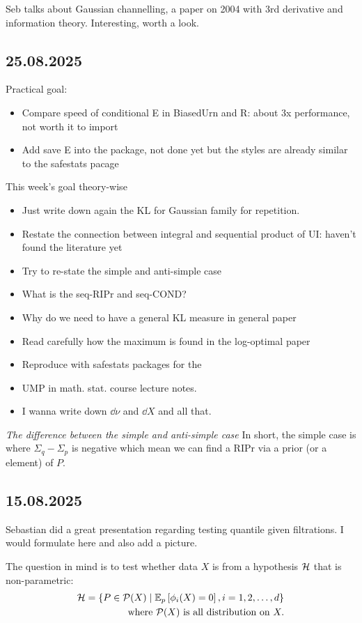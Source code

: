 Seb talks about Gaussian channelling, a paper on 2004 with 3rd derivative
and information theory. Interesting, worth a look.

\subsection*{25.08.2025}
Practical goal:
\begin{itemize}
	\item Compare speed of conditional E in BiasedUrn and R: about 3x performance, not worth it to import
	\item Add save E into the package, not done yet but the styles are already similar to the safestats
	      pacage
\end{itemize}

This week's goal theory-wise
\begin{itemize}
	\item Just write down again the KL for Gaussian family for repetition.
	\item Restate the connection between integral and sequential product of UI:
	      haven't found the literature yet
	\item Try to re-state the simple and anti-simple case
	\item What is the seq-RIPr and seq-COND?
	\item Why do we need to have a general KL measure in general paper
	\item Read carefully how the maximum is found in the log-optimal paper
	\item Reproduce with safestats packages for the
	\item UMP in math. stat. course lecture notes.
	\item I wanna write down $\dd{\nu}$ and $\dd{X}$ and all that.
\end{itemize}

\emph{The difference between the simple and anti-simple case} In short, the simple case
is where $\Sigma_q-\Sigma_p$ is negative which mean we can find a RIPr via a prior (or a element)
of $P$.

\subsection*{15.08.2025} Sebastian did a great presentation regarding testing
quantile given filtrations. I would formulate here and also add a picture.

The question in mind is to test whether data $X$ is from a hypothesis $\mathcal{H}$ that
is non-parametric:
\begin{align*}
	\Hc = \left\{P \in \Pc(X) \mid \ERWi{p}{\phi_i(X)=0}, i=1,2,\dots,d\right\} \\
	\text{where } \Pc(X) \text{ is all distribution on } X.
\end{align*}

